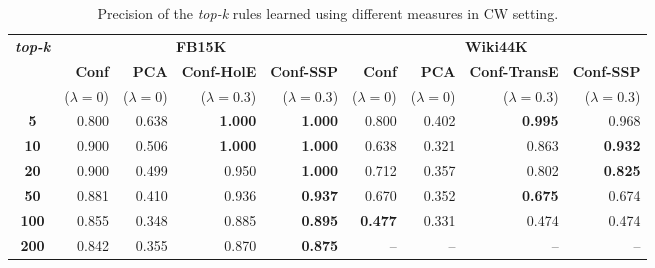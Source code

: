\setlength\tabcolsep{0.2em}
\begin{table}[t]
\scriptsize
\centering
\begin{tabular}{c |r r r r |r r r r} 
 \multirow{3}{*}{\textbf{\textit{top-k}}} & \multicolumn{4}{c}{\textbf{FB15K}} & \multicolumn{4}{|c}{\textbf{Wiki44K}} \\
 \cmidrule{2-9}
 & \textbf{Conf}&  \textbf{PCA} & \textbf{Conf-HolE}& \textbf{Conf-SSP} &  \textbf{Conf}&  \textbf{PCA} & \textbf{Conf-TransE}& \textbf{Conf-SSP}\\
  & {\scriptsize($\lambda=0$)}  & {\scriptsize($\lambda=0$)} & {\scriptsize($\lambda=0.3$)} & {\scriptsize($\lambda=0.3$)} & {\scriptsize($\lambda=0$)} & {\scriptsize($\lambda=0$)} &{\scriptsize($\lambda=0.3$)} & {\scriptsize($\lambda=0.3$)}\\
 \midrule
 \textbf{5} & 0.800 & 0.638 & \textbf{1.000} & \textbf{1.000} & 0.800 & 0.402 & \textbf{0.995} & 0.968\\
\textbf{10} & 0.900 & 0.506 & \textbf{1.000} & \textbf{1.000} & 0.638 & 0.321 & 0.863 & \textbf{0.932} \\
\textbf{20} & 0.900 & 0.499 & 0.950 & \textbf{1.000} & 0.712 & 0.357 & 0.802 & \textbf{0.825}\\
\textbf{50} & 0.881 & 0.410 & 0.936 & \textbf{0.937} & 0.670 & 0.352 & \textbf{0.675} & 0.674 \\
\textbf{100} & 0.855 & 0.348 & 0.885 & \textbf{0.895} & \textbf{0.477} & 0.331 & 0.474 & 0.474\\
\textbf{200} & 0.842 & 0.355 & 0.870 & \textbf{0.875} & -- & -- & -- & -- \\
 \bottomrule
\end{tabular}
\caption*{Precision of the \textit{top-k} rules learned using different measures in CW setting.}
\label{table:avg_quality}
\vspace*{-3mm}
\end{table}
